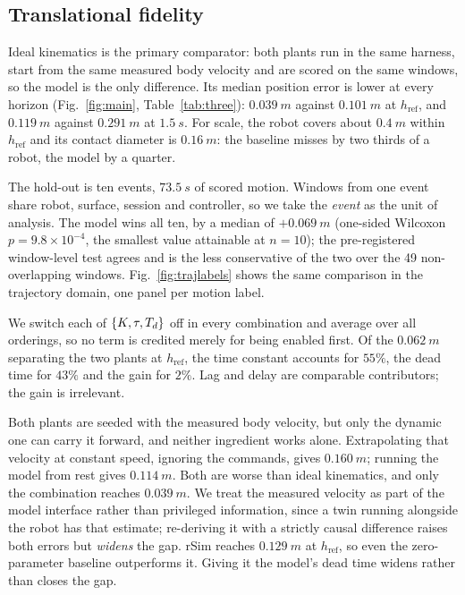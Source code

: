 \subsection{Translational fidelity}
\label{sec:results:rsim}

Ideal kinematics is the primary comparator: both plants run in the same
harness, start from the same measured body velocity and are scored on the same
windows, so the model is the only difference. Its median position error is
lower at every horizon (Fig.~\ref{fig:main}, Table~\ref{tab:three}):
$\SI{0.039}{m}$ against $\SI{0.101}{m}$ at $h_{\mathrm{ref}}$, and
$\SI{0.119}{m}$ against $\SI{0.291}{m}$ at $\SI{1.5}{s}$. For scale, the robot
covers about $\SI{0.4}{m}$ within $h_{\mathrm{ref}}$ and its contact diameter is
$\SI{0.16}{m}$: the baseline misses by two thirds of a robot, the model by a
quarter.

The hold-out is ten events, $\SI{73.5}{s}$ of scored motion. Windows from one event share robot, surface, session and controller, so we take the \emph{event} as the unit of analysis. The model wins all ten, by a median of $+\SI{0.069}{m}$ (one-sided Wilcoxon $p = 9.8\times10^{-4}$, the smallest value attainable at $n = 10$); the pre-registered window-level test agrees and is the less conservative of the two over the 49 non-overlapping windows. Fig.~\ref{fig:trajlabels} shows the same comparison in the trajectory domain, one panel per motion label.



We switch each of $\{K,\tau,T_{d}\}$ off in every combination and average over all
orderings, so no term is credited merely for being enabled first. Of the
$\SI{0.062}{m}$ separating the two plants at $h_{\mathrm{ref}}$, the time
constant accounts for $55\%$, the dead time for $43\%$ and the gain for $2\%$.
Lag and delay are comparable contributors; the gain is irrelevant.

Both plants are seeded with the measured body velocity, but only the dynamic one
can carry it forward, and neither ingredient works alone. Extrapolating that
velocity at constant speed, ignoring the commands, gives $\SI{0.160}{m}$;
running the model from rest gives $\SI{0.114}{m}$. Both are worse than ideal
kinematics, and only the combination reaches $\SI{0.039}{m}$. We treat the
measured velocity as part of the model interface rather than privileged
information, since a twin running alongside the robot has that estimate;
re-deriving it with a strictly causal difference raises both errors but
\emph{widens} the gap. rSim reaches $\SI{0.129}{m}$ at $h_{\mathrm{ref}}$, so even the zero-parameter baseline outperforms it. Giving it the model's dead time widens rather than closes the gap.


